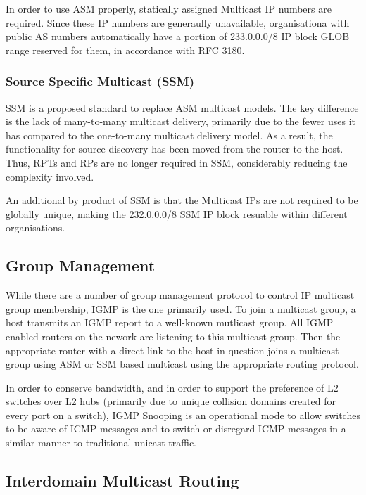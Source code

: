 In order to use ASM properly, statically assigned Multicast IP numbers
are required. Since these IP numbers are generaully unavailable,
organisationa with public AS numbers automatically have a portion of
233.0.0.0/8 IP block GLOB range reserved for them, in accordance with 
RFC 3180.

\subsubsection{Source Specific Multicast (SSM)}
\label{sec:ssm}

SSM is a proposed standard to replace ASM multicast models. The key
difference is the lack of many-to-many multicast delivery, primarily due
to the fewer uses it has compared to the one-to-many multicast delivery
model. As a result, the functionality for source discovery has been
moved from the router to the host. Thus, RPTs and RPs are no longer
required in SSM, considerably reducing the complexity involved.


An additional by product of SSM is that the Multicast IPs are not 
required to be globally unique, making the 232.0.0.0/8 SSM IP block
resuable within different organisations.

\subsection{Group Management}

While there are a number of group management protocol to control IP
multicast group membership, IGMP is the one primarily used. To join a
multicast group, a host transmits an IGMP report to a well-known
mutlicast group. All IGMP enabled routers on the nework are listening to
this multicast group. Then the appropriate router with a direct link to
the host in question joins a multicast group using ASM or SSM based
multicast using the appropriate routing protocol.


In order to conserve bandwidth, and in order to support the preference
of L2 switches over L2 hubs (primarily due to unique collision domains
created for every port on a switch), IGMP Snooping is an operational
mode to allow switches to be aware of ICMP messages and to switch or
disregard ICMP messages in a similar manner to traditional unicast
traffic.

\subsection{Interdomain Multicast Routing}

